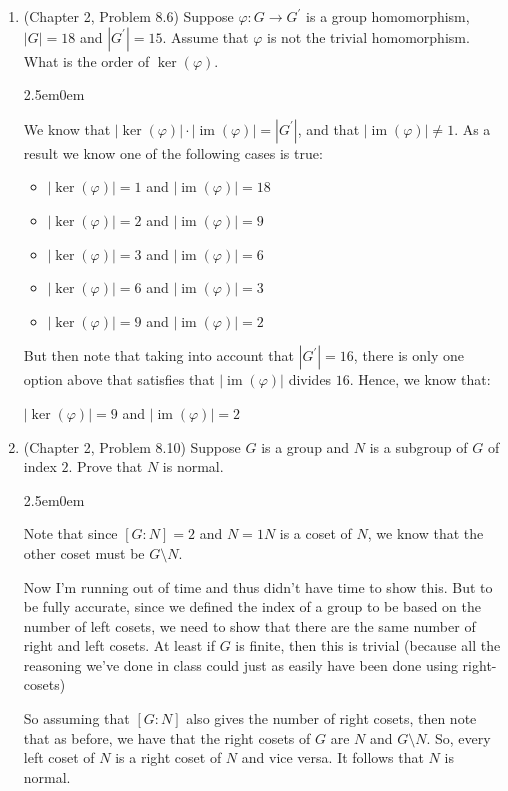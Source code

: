 \documentclass{book}
\newcommand{\exOne}{%
   \color{Purple}%
   \fontsize{13}{15}\selectfont%
}
\newenvironment{myIndent}{%
   \begin{adjustwidth}{2.5em}{0em}%
}{%
   \end{adjustwidth}%
}
\DeclareMathOperator{\im}{im}
\newcommand{\retTwo}{\hfill\bigbreak}
\begin{document}
\begin{enumerate}
	\item (Chapter 2, Problem 8.6) Suppose $\varphi: G \longrightarrow G^\prime$ is a group homomorphism, $|G| = 18$ and $|G^\prime| = 15$. Assume that $\varphi$ is not the trivial homomorphism. What is the order of $\ker(\varphi)$.
	
	\begin{myIndent}\exOne
		We know that $|\ker(\varphi)|\cdot|\im(\varphi)| = |G^\prime|$, and that $|\im(\varphi)| \neq 1$. As a result we know one of the following cases is true:
		\begin{itemize}
			\item $|\ker(\varphi)| = 1$ and $|\im(\varphi)| = 18$
			\item $|\ker(\varphi)| = 2$ and $|\im(\varphi)| = 9$
			\item $|\ker(\varphi)| = 3$ and $|\im(\varphi)| = 6$
			\item $|\ker(\varphi)| = 6$ and $|\im(\varphi)| = 3$
			\item $|\ker(\varphi)| = 9$ and $|\im(\varphi)| = 2$\retTwo
		\end{itemize}
		
		But then note that taking into account that $|G^\prime| = 16$, there is only one option above that satisfies that $|\im(\varphi)|$ divides $16$. Hence, we know that:

		{\center $|\ker(\varphi)| = 9$ and $|\im(\varphi)| = 2$ \retTwo\par}
	\end{myIndent}
	
	\item (Chapter 2, Problem 8.10) Suppose $G$ is a group and $N$ is a subgroup of $G$ of index $2$. Prove that $N$ is normal.
	
	\begin{myIndent}\exOne
		Note that since $[G:N] = 2$ and $N = 1N$ is a coset of $N$, we know that the other coset must be $G \setminus N$.\retTwo

		Now I'm running out of time and thus didn't have time to show this. But to be fully accurate, since we defined the index of a group to be based on the number of left cosets, we need to show that there are the same number of right and left cosets. At least if $G$ is finite, then this is trivial (because all the reasoning we've done in class could just as easily have been done using right-cosets)\retTwo

		So assuming that $[G:N]$ also gives the number of right cosets, then note that as before, we have that the right cosets of $G$ are $N$ and $G \setminus N$. So, every left coset of $N$ is a right coset of $N$ and vice versa. It follows that $N$ is normal.
		\newpage
	\end{myIndent}
\end{enumerate}
\end{document}
